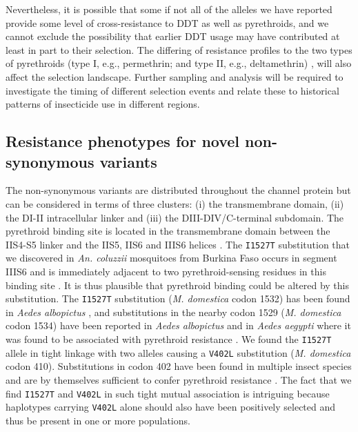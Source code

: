\documentclass[a4paper,11pt,abstracton,hidelinks]{scrartcl}
\begin{document}
%
Nevertheless, it is possible that some if not all of the alleles we have reported provide some level of cross-resistance to DDT as well as pyrethroids, and we cannot exclude the possibility that earlier DDT usage may have contributed at least in part to their selection.
%
The differing of resistance profiles to the two types of pyrethroids (type I, e.g., permethrin; and type II, e.g., deltamethrin) \cite{Hu2011}, will also affect the selection landscape.
%
Further sampling and analysis will be required to investigate the timing of different selection events and relate these to historical patterns of insecticide use in different regions.


\subsection*{Resistance phenotypes for novel non-synonymous variants}

%
The non-synonymous variants are distributed throughout the channel protein but can be considered in terms of three clusters: (i) the transmembrane domain, (ii) the DI-II intracellular linker and (iii) the DIII-DIV/C-terminal subdomain.
%
The pyrethroid binding site is located in the transmembrane domain between the IIS4-S5 linker and the IIS5, IIS6 and IIIS6 helices \cite{OReilly2006}.
%
The \texttt{I1527T} substitution that we discovered in \textit{An. coluzzii} mosquitoes from Burkina Faso occurs in segment IIIS6 and is immediately adjacent to two pyrethroid-sensing residues in this binding site \cite{Dong2014}.
%
It is thus plausible that pyrethroid binding could be altered by this substitution.
%
The \texttt{I1527T} substitution (\textit{M. domestica} codon 1532) has been found in \textit{Aedes albopictus} \cite{Xu2016}, and substitutions in the nearby codon 1529 (\textit{M. domestica} codon 1534) have been reported in \textit{Aedes albopictus} and in \textit{Aedes aegypti} where it was found to be associated with pyrethroid resistance \cite{Dong2014, Ishak2015,Li2018}.
%
We found the \texttt{I1527T} allele in tight linkage with two alleles causing a \texttt{V402L} substitution (\textit{M. domestica} codon 410).
%
Substitutions in codon 402 have been found in multiple insect species and are by themselves sufficient to confer pyrethroid resistance \cite{Dong2014}.
%
The fact that we find \texttt{I1527T} and \texttt{V402L} in such tight mutual association is intriguing because haplotypes carrying \texttt{V402L} alone should also have been positively selected and thus be present in one or more populations.
%
\end{document}
